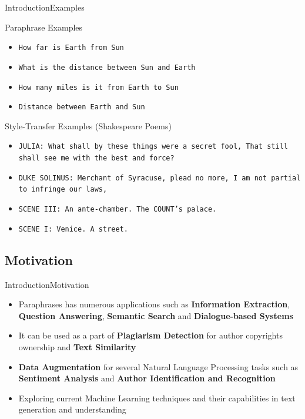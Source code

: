 \documentclass[10pt]{beamer}
\begin{document}
\begin{frame}{Introduction}{Examples}
	\begin{block}{Paraphrase Examples}
			\begin{itemize}
				\item {\tt How far is Earth from Sun}
				\item {\tt What is the distance between Sun and Earth}
				\item {\tt How many miles is it from Earth to Sun}
                \item {\tt Distance between Earth and Sun}
			\end{itemize}
	\end{block}
    
    \begin{block}{Style-Transfer Examples (Shakespeare Poems)}
            \begin{itemize}
				\item {\tt JULIA: What shall by these things were a secret fool, That still shall see me with the best and force?}
                \item {\tt DUKE SOLINUS: Merchant of Syracuse, plead no more, I am not partial to infringe our laws,}
                \item {\tt SCENE III: An ante-chamber. The COUNT's palace.}
                \item {\tt SCENE I: Venice. A street.}
			\end{itemize}
	\end{block}
\end{frame}

\subsection{Motivation}
\begin{frame}{Introduction}{Motivation}
\begin{itemize}
    \item<1-> Paraphrases has numerous applications such as \textbf{Information Extraction}, \textbf{Question Answering}, \textbf{Semantic Search} and \textbf{Dialogue-based Systems} 
    \item<1-> It can be used as a part of \textbf{Plagiarism Detection}  for author copyrights ownership and \textbf{Text Similarity}
    \item<1-> \textbf{Data Augmentation} for several Natural Language Processing tasks such as \textbf{Sentiment Analysis} and \textbf{Author Identification and Recognition}
    \item<1-> Exploring current Machine Learning techniques and their capabilities in text generation and understanding
  \end{itemize}
\end{frame}
\end{document}
